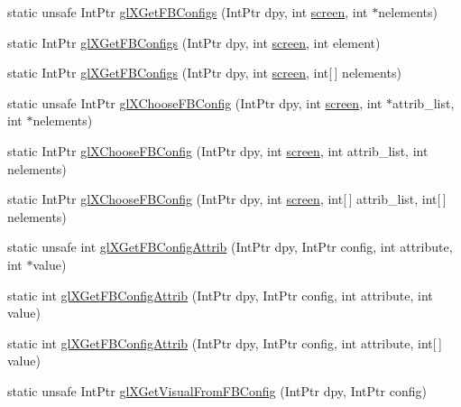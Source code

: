 \begin{DoxyCompactItemize}
\item 
static unsafe IntPtr \hyperlink{class_tao_1_1_platform_1_1_x11_1_1_glx_acf569b64c3d09b981d207acde0ec995f}{glXGetFBConfigs} (IntPtr dpy, int \hyperlink{_sdl_8cs_a968bba55c7ad32b326939fefd1bbb017}{screen}, int $\ast$nelements)
\item 
static IntPtr \hyperlink{class_tao_1_1_platform_1_1_x11_1_1_glx_a97ac43d639ad3179313a2f7ca53bc6c3}{glXGetFBConfigs} (IntPtr dpy, int \hyperlink{_sdl_8cs_a968bba55c7ad32b326939fefd1bbb017}{screen}, int element)
\item 
static IntPtr \hyperlink{class_tao_1_1_platform_1_1_x11_1_1_glx_a86ceef49838885b76b0ca087d1834e3f}{glXGetFBConfigs} (IntPtr dpy, int \hyperlink{_sdl_8cs_a968bba55c7ad32b326939fefd1bbb017}{screen}, int\mbox{[}$\,$\mbox{]} nelements)
\item 
static unsafe IntPtr \hyperlink{class_tao_1_1_platform_1_1_x11_1_1_glx_aa94f75195806917a0b3697e3dc3dd942}{glXChooseFBConfig} (IntPtr dpy, int \hyperlink{_sdl_8cs_a968bba55c7ad32b326939fefd1bbb017}{screen}, int $\ast$attrib\_\-list, int $\ast$nelements)
\item 
static IntPtr \hyperlink{class_tao_1_1_platform_1_1_x11_1_1_glx_a653db4c1f31f17527a1acd515f467e4b}{glXChooseFBConfig} (IntPtr dpy, int \hyperlink{_sdl_8cs_a968bba55c7ad32b326939fefd1bbb017}{screen}, int attrib\_\-list, int nelements)
\item 
static IntPtr \hyperlink{class_tao_1_1_platform_1_1_x11_1_1_glx_a81c1ef09ac39a0052f1387c97016ed0f}{glXChooseFBConfig} (IntPtr dpy, int \hyperlink{_sdl_8cs_a968bba55c7ad32b326939fefd1bbb017}{screen}, int\mbox{[}$\,$\mbox{]} attrib\_\-list, int\mbox{[}$\,$\mbox{]} nelements)
\item 
static unsafe int \hyperlink{class_tao_1_1_platform_1_1_x11_1_1_glx_a828cca50b0aa387c293c93732f09c753}{glXGetFBConfigAttrib} (IntPtr dpy, IntPtr config, int attribute, int $\ast$value)
\item 
static int \hyperlink{class_tao_1_1_platform_1_1_x11_1_1_glx_a9b7e0157fd74b4f857a413c08f994660}{glXGetFBConfigAttrib} (IntPtr dpy, IntPtr config, int attribute, int value)
\item 
static int \hyperlink{class_tao_1_1_platform_1_1_x11_1_1_glx_a6d8ce25ff4b2136b29090b813cd76b6e}{glXGetFBConfigAttrib} (IntPtr dpy, IntPtr config, int attribute, int\mbox{[}$\,$\mbox{]} value)
\item 
static unsafe IntPtr \hyperlink{class_tao_1_1_platform_1_1_x11_1_1_glx_a7433453f8a6b150d6376f99e28741499}{glXGetVisualFromFBConfig} (IntPtr dpy, IntPtr config)

\end{DoxyCompactItemize}
